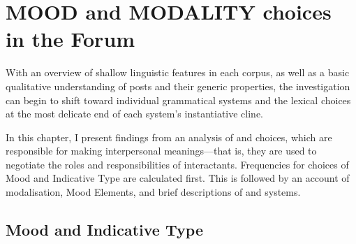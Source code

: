 
\chapter{MOOD and MODALITY choices in the Forum} \label{chap:interpersonal}

With an overview of shallow linguistic features in each \gls{corpus}, as well as a basic qualitative understanding of \glspl{post} and their generic properties, the investigation can begin to shift toward individual grammatical systems and the lexical choices at the most delicate end of each system's instantiative cline.

In this chapter, I present findings from an analysis of  and  choices, which are responsible for making interpersonal meanings---that is, they are used to negotiate the roles and responsibilities of interactants. Frequencies for choices of Mood and Indicative Type are calculated first. This is followed by an account of modalisation, Mood Elements, and brief descriptions of  and  systems.%

\section{Mood and Indicative Type}



